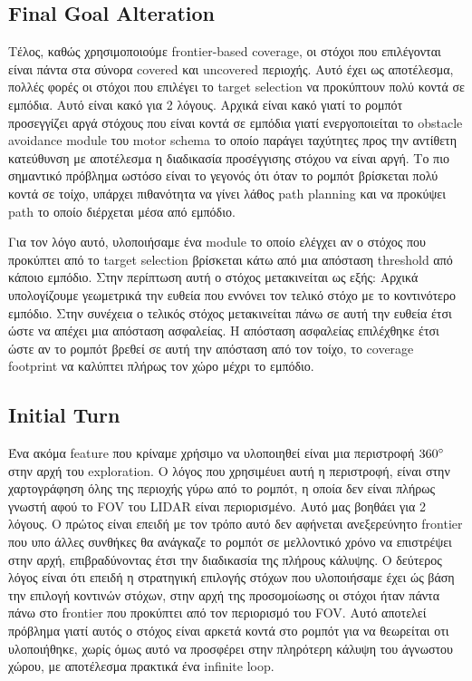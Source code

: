 \subsection*{Final Goal Alteration}

Τέλος, καθώς χρησιμοποιούμε frontier-based coverage, οι στόχοι που επιλέγονται είναι πάντα στα σύνορα covered και uncovered περιοχής. Αυτό έχει ως αποτέλεσμα, πολλές φορές οι στόχοι που επιλέγει το target selection να προκύπτουν πολύ κοντά σε εμπόδια. Αυτό είναι κακό για 2 λόγους. Αρχικά είναι κακό γιατί το ρομπότ προσεγγίζει αργά στόχους που είναι κοντά σε εμπόδια γιατί ενεργοποιείται το obstacle avoidance module του motor schema το οποίο παράγει ταχύτητες προς την αντίθετη κατεύθυνση με αποτέλεσμα η διαδικασία προσέγγισης στόχου να είναι αργή. Το πιο σημαντικό πρόβλημα ωστόσο είναι το γεγονός ότι όταν το ρομπότ βρίσκεται πολύ κοντά σε τοίχο, υπάρχει πιθανότητα να γίνει λάθος path planning και να προκύψει path το οποίο διέρχεται μέσα από εμπόδιο.

Για τον λόγο αυτό, υλοποιήσαμε ένα module το οποίο ελέγχει αν ο στόχος που προκύπτει από το target selection βρίσκεται κάτω από μια απόσταση threshold από κάποιο εμπόδιο. Στην περίπτωση αυτή ο στόχος μετακινείται ως εξής: Αρχικά υπολογίζουμε γεωμετρικά την ευθεία που εννόνει τον τελικό στόχο με το κοντινότερο εμπόδιο. Στην συνέχεια ο τελικός στόχος μετακινείται πάνω σε αυτή την ευθεία έτσι ώστε να απέχει μια απόσταση ασφαλείας. Η απόσταση ασφαλείας επιλέχθηκε έτσι ώστε αν το ρομπότ βρεθεί σε αυτή την απόσταση από τον τοίχο, το coverage footprint να καλύπτει πλήρως τον χώρο μέχρι το εμπόδιο.

\subsection*{Initial Turn}
Ένα ακόμα feature που κρίναμε χρήσιμο να υλοποιηθεί είναι μια περιστροφή $360\degree$ στην αρχή του exploration. Ο λόγος που χρησιμέυει αυτή η περιστροφή, είναι στην χαρτογράφηση όλης της περιοχής γύρω από το ρομπότ, η οποία δεν είναι πλήρως γνωστή αφού το FOV του LIDAR είναι περιορισμένο. Αυτό μας βοηθάει για 2 λόγους. Ο πρώτος είναι επειδή με τον τρόπο αυτό δεν αφήνεται ανεξερεύνητο frontier που υπο άλλες συνθήκες θα ανάγκαζε το ρομπότ σε μελλοντικό χρόνο να επιστρέψει στην αρχή, επιβραδύνοντας έτσι την διαδικασία της πλήρους κάλυψης. Ο δεύτερος λόγος είναι ότι επειδή η στρατηγική επιλογής στόχων που υλοποιήσαμε έχει ώς βάση την επιλογή κοντινών στόχων, στην αρχή της προσομοίωσης οι στόχοι ήταν πάντα πάνω στο frontier που προκύπτει από τον περιορισμό του FOV. Αυτό αποτελεί πρόβλημα γιατί αυτός ο στόχος είναι αρκετά κοντά στο ρομπότ για να θεωρείται οτι υλοποιήθηκε, χωρίς όμως αυτό να προσφέρει στην πληρότερη κάλυψη του άγνωστου χώρου, με αποτέλεσμα πρακτικά ένα infinite loop.
